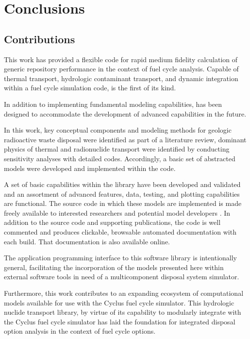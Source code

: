 \chapter{Conclusions}\label{ch:conclusion}
\section{Contributions}

This work has provided a flexible code for rapid medium fidelity calculation of 
generic repository performance in the context of fuel cycle analysis.  Capable 
of thermal transport, hydrologic contaminant transport, and dynamic integration 
within a fuel cycle simulation code, \Cyder is the first of its kind.  

In addition to implementing fundamental modeling capabilities, \Cyder has been 
designed to accommodate the development of advanced capabilities in the future.

In this work, key conceptual components and modeling methods for geologic 
radioactive waste disposal were identified as part of a literature review, 
dominant physics of thermal and radionuclide transport were identified by 
conducting sensitivity analyses with detailed codes. Accordingly, a basic set 
of abstracted models were developed and implemented within the \Cyder code. 

A set of basic capabilities within the \Cyder library have been developed and 
validated and an assortment of advanced features, data, testing, and plotting 
capabilities are functional.  The \Cyder source code in which these models are 
implemented  is made freely available to interested researchers and potential 
model developers \cite{huff_cyder_2012}. In addition to the source code and 
supporting publications, the \Cyder code is well commented and produces 
clickable, browsable automated documentation with each build. That 
documentation is also available online.

The application programming interface to this software library is intentionally 
general, facilitating the incorporation of the models presented here within 
external software tools in need of a multicomponent disposal system simulator. 

Furthermore, this work contributes to an expanding ecosystem of computational 
models available for use with the Cyclus fuel cycle simulator. This hydrologic 
nuclide transport library, by virtue of its capability to modularly integrate 
with the Cyclus fuel cycle simulator has laid the foundation for integrated 
disposal option analysis in the context of fuel cycle options. 

